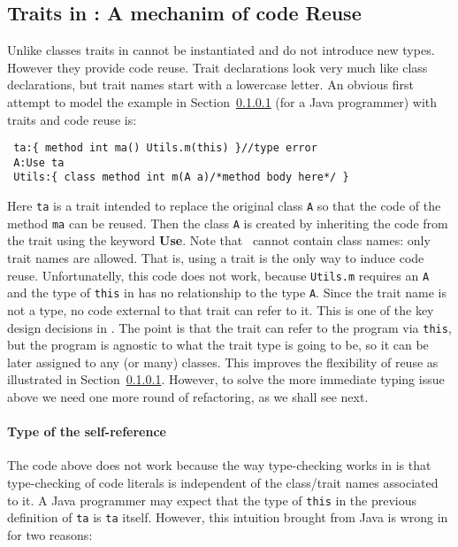 \subsection{Traits in \name: A mechanim of code Reuse}

Unlike classes traits in \name cannot be instantiated and do not introduce new
types. However they provide code reuse.
Trait declarations 
look very much like class declarations, but trait names 
start with a lowercase letter. An obvious first attempt 
to model the example in Section~\ref{} (for a Java programmer) 
with traits and code reuse is:

\begin{lstlisting}
 ta:{ method int ma() Utils.m(this) }//type error
 A:Use ta
 Utils:{ class method int m(A a)/*method body here*/ }
\end{lstlisting}

\noindent Here \lstinline{ta} is a trait intended to replace the
original class \lstinline{A} so that the code of the method
\lstinline{ma} can be reused. Then the class \lstinline{A} 
is created by inheriting the code from the trait using the keyword 
{\bf Use}. Note that \use\ cannot contain class names: only trait
names are allowed.
That is, using a trait is the only way to induce code reuse.
Unfortunatelly, this code does not work, 
because \lstinline{Utils.m} requires an \lstinline{A} and the type of \lstinline{this} in
\Q@ta@ has no relationship to the type \lstinline{A}.
Since the trait name is not a type, no code external to that trait can
refer to it. This is one of the key design decisions in \name. 
The point is that the trait can refer to the program via \lstinline{this}, but the
program is agnostic to what the trait type is going to be, so it can
be later assigned to any (or many) classes. This improves the
flexibility of reuse as illustrated in Section~\ref{}. However, 
to solve the more immediate typing issue above we need one more
round of refactoring, as we shall see next. 



\paragraph{Type of the self-reference} The code above does not work
because the way type-checking works in \name is that type-checking of 
code literals is independent of the class/trait names associated to
it. A Java programmer may expect that the type of \lstinline{this} 
in the previous definition of \lstinline{ta} is \lstinline{ta}
itself. However, this intuition brought from Java is wrong in \name
for two reasons:


